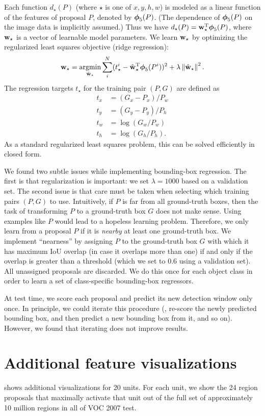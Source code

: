 Each function $d_\star(P)$ (where $\star$ is one of $x,y,h,w$) is modeled as a linear function of the  features of proposal $P$, denoted by $\mbox{\boldmath $\phi$}_5(P)$.
(The dependence of $\mbox{\boldmath $\phi$}_5(P)$ on the image data is implicitly assumed.) 
Thus we have $d_\star(P) = {\bf w}_\star^{\textrm{T}} \mbox{\boldmath $\phi$}_5(P)$, where ${\bf w}_\star$ is a vector of learnable model parameters.
We learn ${\bf w}_\star$ by optimizing the regularized least squares objective (ridge regression):
\begin{align}
{\bf w}_\star = \operatorname*{argmin}_{\hat{{\bf w}}_\star} \sum_i^N (t^i_\star - \hat{{\bf w}}_\star^{\textrm{T}} \mbox{\boldmath $\phi$}_5(P^i))^2 + \lambda \left\lVert\hat{{\bf w}}_\star\right\rVert^2.
\end{align}
The regression targets $t_\star$ for the training pair $(P, G)$ are defined as
\begin{align}
t_x &= (G_x - P_x) / P_w \\
t_y &= (G_y - P_y) / P_h \\
t_w &= \log(G_w / P_w) \\
t_h &= \log(G_h / P_h).
\end{align}
As a standard regularized least squares problem, this can be solved efficiently in closed form.

We found two subtle issues while implementing bounding-box regression.
The first is that regularization is important: we set $\lambda = 1000$ based on a validation set.
The second issue is that care must be taken when selecting which training pairs $(P,G)$ to use.
Intuitively, if $P$ is far from all ground-truth boxes, then the task of transforming $P$ to a ground-truth box $G$ does not make sense.
Using examples like $P$ would lead to a hopeless learning problem.
Therefore, we only learn from a proposal $P$ if it is \emph{nearby} at least one ground-truth box.
We implement ``nearness'' by assigning $P$ to the ground-truth box $G$ with which it has maximum IoU overlap (in case it overlaps more than one) if and only if the overlap is greater than a threshold (which we set to 0.6 using a validation set).
All unassigned proposals are discarded.
We do this once for each object class in order to learn a set of class-specific bounding-box regressors.

At test time, we score each proposal and predict its new detection window only once.
In principle, we could iterate this procedure (\ie, re-score the newly predicted bounding box, and then predict a new bounding box from it, and so on).
However, we found that iterating does not improve results.

\section{Additional feature visualizations}
 shows additional visualizations for 20  units.
For each unit, we show the 24 region proposals that maximally activate that unit out of the full set of approximately 10 million regions in all of VOC 2007 test.

